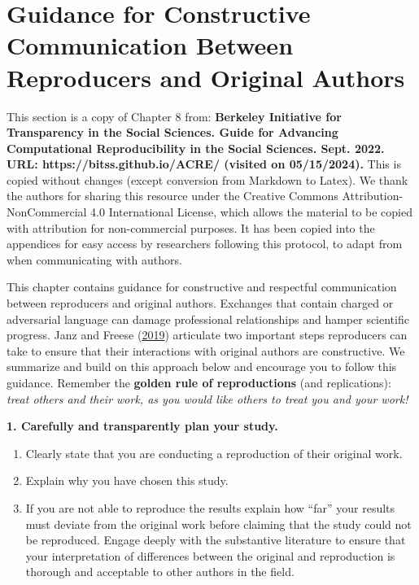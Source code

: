 \section{Guidance for Constructive Communication Between Reproducers and Original Authors}
\label{appendix:acre}

\begin{shaded}
    This section is a copy of Chapter 8 from: \textbf{Berkeley Initiative for Transparency in the Social Sciences. Guide for Advancing Computational Reproducibility in the Social Sciences. Sept. 2022. URL: https://bitss.github.io/ACRE/ (visited on 05/15/2024).}\autocite{berkeley_initiative_for_transparency_in_the_social_sciences_guide_2022} This is copied without changes (except conversion from Markdown to Latex). We thank the authors for sharing this resource under the Creative Commons Attribution-NonCommercial 4.0 International License, which allows the material to be copied with attribution for non-commercial purposes. It has been copied into the appendices for easy access by researchers following this protocol, to adapt from when communicating with authors.
\end{shaded}

This chapter contains guidance for constructive and respectful communication between reproducers and original authors. Exchanges that contain charged or adversarial language can damage professional relationships and hamper scientific progress. Janz and Freese (\href{https://www.mzes.uni-mannheim.de/openscience/wp-content/uploads/2019/01/Janz-Freese_-Good-and-Bad-Replications-1.pdf}{2019}) articulate two important steps reproducers can take to ensure that their interactions with original authors are constructive. We summarize and build on this approach below and encourage you to follow this guidance. Remember the \textbf{golden rule of reproductions} (and replications): \textit{treat others and their work, as you would like others to treat you
and your work!}

\textbf{1. Carefully and transparently plan your study.}

\begin{enumerate}[label=(\alph*)]
    \item Clearly state that you are conducting a reproduction of their original work.
    \item Explain why you have chosen this study.
    \item If you are not able to reproduce the results explain how ``far'' your results must deviate from the original work before claiming that the study could not be reproduced. Engage deeply with the substantive literature to ensure that your interpretation of differences between the original and reproduction is thorough and acceptable to other authors in the field.
\end{enumerate}

